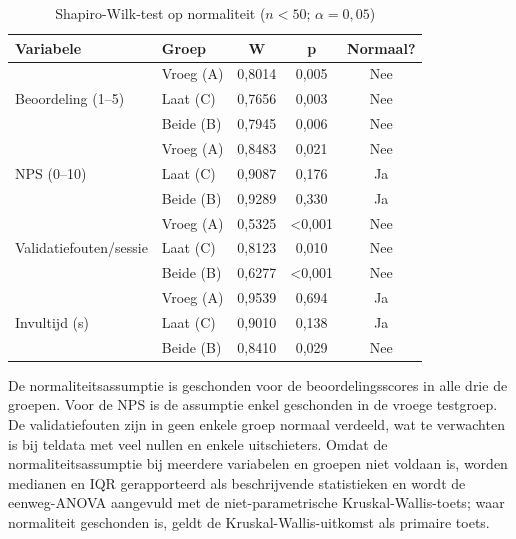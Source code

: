 \begin{table}[h]
  \centering
  \caption[Shapiro-Wilk normaliteitstest per variabele en groep]{Shapiro-Wilk-test op normaliteit ($n < 50$; $\alpha = 0{,}05$)}
  \label{tab:shapiro-wilk}
  \begin{tabular}{llccc}
    \hline
    \textbf{Variabele} & \textbf{Groep} & \textbf{W} & \textbf{p} & \textbf{Normaal?} \\
    \hline
    \multirow{3}{*}{Beoordeling (1–5)}
      & Vroeg (A)  & 0,8014 & 0,005 & Nee \\
      & Laat (C)   & 0,7656 & 0,003 & Nee \\
      & Beide (B)  & 0,7945 & 0,006 & Nee \\
    \hline
    \multirow{3}{*}{NPS (0–10)}
      & Vroeg (A)  & 0,8483 & 0,021 & Nee \\
      & Laat (C)   & 0,9087 & 0,176 & Ja  \\
      & Beide (B)  & 0,9289 & 0,330 & Ja  \\
    \hline
    \multirow{3}{*}{Validatiefouten/sessie}
      & Vroeg (A)  & 0,5325 & \textless 0,001 & Nee \\
      & Laat (C)   & 0,8123 & 0,010 & Nee \\
      & Beide (B)  & 0,6277 & \textless 0,001 & Nee \\
    \hline
    \multirow{3}{*}{Invultijd (s)}
      & Vroeg (A)  & 0,9539 & 0,694 & Ja  \\
      & Laat (C)   & 0,9010 & 0,138 & Ja  \\
      & Beide (B)  & 0,8410 & 0,029 & Nee \\
    \hline
  \end{tabular}
\end{table}

De normaliteitsassumptie is geschonden voor de beoordelingsscores in alle drie de groepen. Voor de NPS is de assumptie enkel geschonden in de vroege testgroep. De validatiefouten zijn in geen enkele groep normaal verdeeld, wat te verwachten is bij teldata met veel nullen en enkele uitschieters. Omdat de normaliteitsassumptie bij meerdere variabelen en groepen niet voldaan is, worden medianen en IQR gerapporteerd als beschrijvende statistieken en wordt de eenweg-ANOVA aangevuld met de niet-parametrische Kruskal-Wallis-toets; waar normaliteit geschonden is, geldt de Kruskal-Wallis-uitkomst als primaire toets.

\subsection{}

